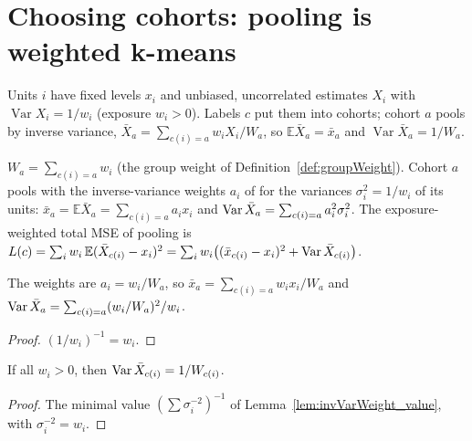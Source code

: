 \section{Choosing cohorts: pooling is weighted k-means}\label{sec:kmeans_bridge}

Units $i$ have fixed levels $x_i$ and unbiased, uncorrelated estimates
$X_i$ with $\operatorname{Var} X_i = 1/w_i$ (exposure $w_i > 0$). Labels
$c$ put them into cohorts; cohort $a$ pools by inverse variance,
$\bar X_a = \sum_{c(i)=a} w_i X_i / W_a$, so $\mathbb E \bar X_a = \bar x_a$
and $\operatorname{Var} \bar X_a = 1/W_a$.

\begin{definition}\label{def:poolLoss}
  \leanok
  $W_a = \sum_{c(i)=a} w_i$ (the group weight of Definition~\ref{def:groupWeight}). Cohort $a$ pools with the inverse-variance
  weights $a_i$ of  for the variances $\sigma_i^2 = 1/w_i$ of its
  units: $\bar x_a = \mathbb E\bar X_a = \sum_{c(i)=a} a_i x_i$ and
  $\operatorname{Var} \bar X_a = \sum_{c(i)=a} a_i^2 \sigma_i^2$. The exposure-weighted
  total MSE of pooling is
  $L(c) = \sum_i w_i\,\mathbb E(\bar X_{c(i)} - x_i)^2
  = \sum_i w_i\bigl((\bar x_{c(i)} - x_i)^2 + \operatorname{Var} \bar X_{c(i)}\bigr)$.
\end{definition}

\begin{lemma}\label{lem:cohortMean_eq}
  \leanok
  The weights  are $a_i = w_i / W_a$, so
  $\bar x_a = \sum_{c(i)=a} w_i x_i / W_a$ and
  $\operatorname{Var} \bar X_a = \sum_{c(i)=a} (w_i/W_a)^2 / w_i$.
\end{lemma}
\begin{proof}
  \leanok
  $(1/w_i)^{-1} = w_i$.
\end{proof}

\begin{lemma}\label{lem:poolVar_eq}
  \leanok
  If all $w_i > 0$, then $\operatorname{Var} \bar X_{c(i)} = 1/W_{c(i)}$.
\end{lemma}
\begin{proof}
  \leanok
  The minimal value $(\sum \sigma_i^{-2})^{-1}$ of
  Lemma~\ref{lem:invVarWeight_value}, with $\sigma_i^{-2} = w_i$.
\end{proof}

